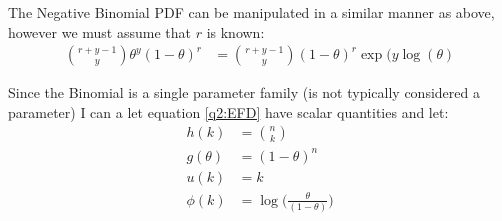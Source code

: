 


The Negative Binomial PDF can be manipulated in a similar manner as above, however we must assume that $r$ is known:
\begin{align*}
    {r+y-1 \choose y}\theta^y(1-\theta)^{r} &= {r+y-1 \choose y}(1-\theta)^{r}\exp(y\log(\theta)
\end{align*}

Since the Binomial is a single parameter family (is not typically considered a parameter) I can a let equation \ref{q2:EFD} have scalar quantities and let:
\begin{align*}
    h(k) &= {n \choose k}\\
    g(\theta) &= (1-\theta)^{n}\\
    u(k) &= k\\
    \phi(k) &= \log\Big(\frac{\theta}{(1-\theta)}\Big)\\
\end{align*}
